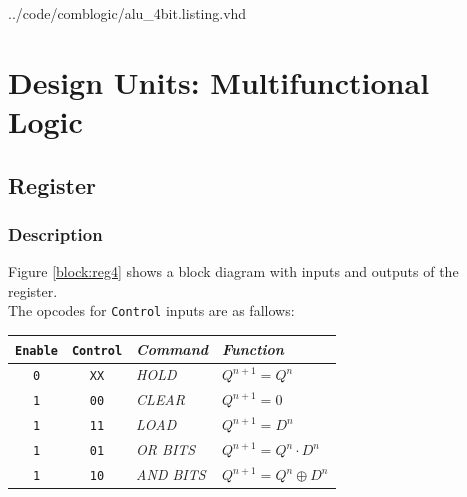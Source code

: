 \documentclass[10pt,a4paper]{report}
\begin{document}

{../code/comblogic/alu_4bit.listing.vhd}


\chapter{Design Units: Multifunctional Logic}

\section{Register}
\subsection{Description}

 Figure \ref{block:reg4} shows a block diagram with
 inputs and outputs of the register. \\ The opcodes for
 \texttt{Control} inputs are as fallows:

 \begin{tabular}{|c|c|l l|}
 \hline
 \texttt{Enable} & \texttt{Control}  & \emph{Command} & \emph{Function} \\
 \hline

 \texttt{0} & \texttt{XX} & \emph{HOLD} & $Q^{n+1} = Q^n$ \\

 \texttt{1} & \texttt{00} & \emph{CLEAR} & $Q^{n+1} = 0$ \\

 \texttt{1} & \texttt{11} & \emph{LOAD} & $Q^{n+1} = D^n$ \\

 \texttt{1} & \texttt{01} & \emph{OR BITS} & $Q^{n+1} = Q^n \cdot D^n$ \\

 \texttt{1} & \texttt{10} & \emph{AND BITS} & $Q^{n+1} = Q^n \oplus D^n$ \\

 \hline

 \end{tabular}
\end{document}

